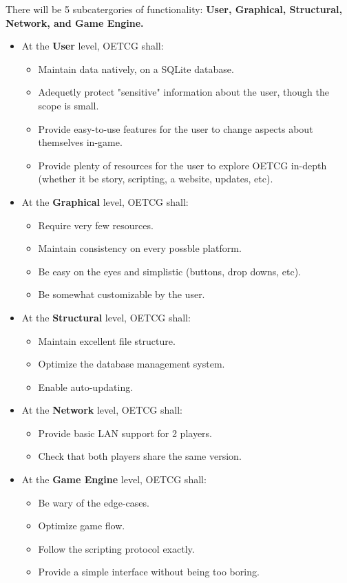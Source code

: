 \documentclass{scrreprt}
\begin{document}
There will be 5 subcatergories of functionality: \textbf{User, Graphical, Structural, Network, and Game Engine.}
\begin{itemize}
	\item 
	At the \textbf{User} level, OETCG shall:
\begin{itemize}
	\item Maintain data natively, on a SQLite database.
	\item Adequetly protect "sensitive" information about the user, though the scope is small.
	\item Provide easy-to-use features for the user to change aspects about themselves in-game.
	\item Provide plenty of resources for the user to explore OETCG in-depth (whether it be story, scripting, a website, updates, etc).
\end{itemize}
	\item
	At the \textbf{Graphical} level, OETCG shall:
\begin{itemize}
	\item Require very few resources.
	\item Maintain consistency on every possble platform.
	\item Be easy on the eyes and simplistic (buttons, drop downs, etc).
	\item Be somewhat customizable by the user.
\end{itemize}
	\item
	At the \textbf{Structural} level, OETCG shall:
	\begin{itemize}
	\item Maintain excellent file structure.
	\item Optimize the database management system.
	\item Enable auto-updating.
\end{itemize}
	\item
	At the \textbf{Network} level, OETCG shall:
	\begin{itemize}
	\item Provide basic LAN support for 2 players.
	\item Check that both players share the same version.
\end{itemize}
	\item
	At the \textbf{Game Engine} level, OETCG shall:
	\begin{itemize}
	\item Be wary of the edge-cases.
	\item Optimize game flow.
	\item Follow the scripting protocol exactly.
	\item Provide a simple interface without being too boring.
\end{itemize}
\end{itemize}
\end{document}
